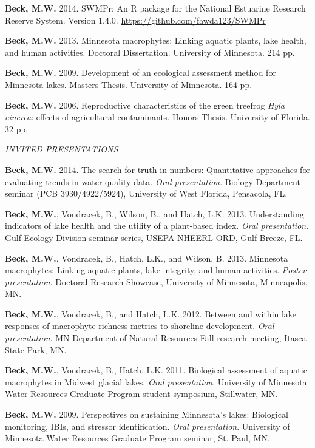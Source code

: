 \documentclass[letterpaper,12pt]{article}
\begin{document}
\textbf{Beck, M.W.} 2014. SWMPr: An R package for the National Estuarine Research Reserve System. Version 1.4.0. \href{https://github.com/fawda123/SWMPr}{https://github.com/fawda123/SWMPr}

\textbf{Beck, M.W.} 2013. Minnesota macrophytes: Linking aquatic plants, lake health, and human activities. Doctoral Dissertation. University of Minnesota. 214 pp.

\textbf{Beck, M.W.} 2009. Development of an ecological assessment method for Minnesota lakes. Masters Thesis. University of Minnesota. 164 pp.

\textbf{Beck, M.W.} 2006. Reproductive characteristics of the green treefrog \textit{Hyla cinerea}: effects of agricultural contaminants. Honors Thesis. University of Florida. 32 pp.

\vspace{\baselineskip} 
\centerline{\large{\textit{INVITED PRESENTATIONS}}}

{\bf Beck, M.W.} 2014. The search for truth in numbers: Quantitative approaches for evaluating trends in water quality data. \textit{Oral presentation}. Biology Department seminar (PCB 3930/4922/5924), University of West Florida, Pensacola, FL. 

{\bf Beck, M.W.}, Vondracek, B., Wilson, B., and Hatch, L.K. 2013. Understanding indicators of lake health and the utility of a plant-based index. \textit{Oral presentation}. Gulf Ecology Division seminar series, USEPA NHEERL ORD, Gulf Breeze, FL.

{\bf Beck, M.W.}, Vondracek, B., Hatch, L.K., and Wilson, B. 2013. Minnesota macrophytes: Linking aquatic plants, lake integrity, and human activities. \textit{Poster presentation}. Doctoral Research Showcase, University of Minnesota, Minneapolis, MN.

{\bf Beck, M.W.}, Vondracek, B., and Hatch, L.K. 2012. Between and within lake responses of macrophyte richness metrics to shoreline development. \textit{Oral presentation}. MN Department of Natural Resources Fall research meeting, Itasca State Park, MN.

{\bf Beck, M.W.}, Vondracek, B., Hatch, L.K. 2011. Biological assessment of aquatic macrophytes in Midwest glacial lakes. \textit{Oral presentation}. University of Minnesota Water Resources Graduate Program student symposium, Stillwater, MN.

{\bf Beck, M.W.} 2009. Perspectives on sustaining Minnesota's lakes: Biological monitoring, IBIs, and stressor identification. \textit{Oral presentation}. University of Minnesota Water Resources Graduate Program seminar, St. Paul, MN.
\end{document}
